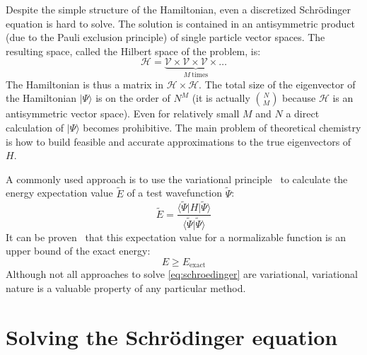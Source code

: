 Despite the simple structure of the Hamiltonian, even a discretized
Schr{\"o}dinger equation is hard to solve. The solution is contained in an 
antisymmetric product (due to the Pauli exclusion 
principle) of single particle vector spaces. The resulting space, called 
the Hilbert space of the problem, is: 
%
\begin{equation}
 \mathcal{H} = \underbrace{\mathcal{V} \times \mathcal{V} \times \mathcal{V} 
\times \ldots}_{M ~\mathrm{times}}
\end{equation}
%
The Hamiltonian is thus a matrix in $\mathcal{H} \times \mathcal{H}$. The total 
size of the eigenvector of the Hamiltonian $|\Psi \rangle$ is 
on the order of $N^{M}$ (it is actually $N \choose M$ because $\mathcal{H}$ is 
an antisymmetric vector space). Even for relatively small $M$ and $N$ a direct 
calculation of $|\Psi \rangle$ becomes prohibitive. The main problem of 
theoretical chemistry is how to build feasible and accurate 
approximations to the true eigenvectors of $H$.

A commonly used approach is to use the variational 
principle~\cite{jensen2017introduction} to 
calculate the energy expectation value $\tilde{E}$ of a test wavefunction 
$\tilde{\Psi}$:
%
\begin{equation}
 \tilde{E} = \frac{\langle \tilde{\Psi} | H | \tilde{\Psi} \rangle}{\langle 
\tilde{\Psi} |\tilde{\Psi} \rangle} 
\end{equation}
%
It can be proven~\cite{levine2000quantum} that this expectation value for a 
normalizable function is an upper bound of the exact energy:
%
\begin{equation}
 E \geq E_{\mathrm{exact}}
\end{equation}
Although not all approaches to solve \ref{eq:schroedinger} are variational, 
variational nature is a valuable property of any particular method. 

\section{Solving the Schr{\"o}dinger equation}
\label{sec:solving}
